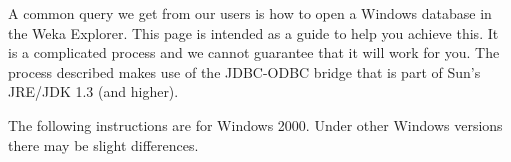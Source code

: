 %
%
%
%


A common query we get from our users is how to open a Windows database in the Weka Explorer. This page is intended as a guide to help you achieve this. It is a complicated process and we cannot guarantee that it will work for you. The process described makes use of the JDBC-ODBC bridge that is part of Sun's JRE/JDK 1.3 (and higher).

The following instructions are for Windows 2000. Under other Windows versions there may be slight differences.

